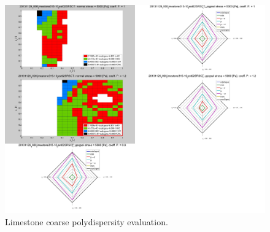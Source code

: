 \begin{figure}[!htb]
\centering
\includegraphics[width=.96\columnwidth]{images/085limestone31510}
\caption[Limestone coarse polydispersity evaluation]{Limestone coarse polydispersity
evaluation.}
\label{fig:085limestone31510}
\end{figure}